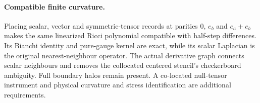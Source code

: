 \paragraph{Compatible finite curvature.}
Placing scalar, vector and symmetric-tensor records at parities
$0$, $e_b$ and $e_a+e_b$ makes the same linearized Ricci polynomial compatible
with half-step differences. Its Bianchi identity and pure-gauge kernel are
exact, while its scalar Laplacian is the original nearest-neighbour operator.
The actual derivative graph connects scalar neighbours and removes the
collocated centered stencil's checkerboard ambiguity. Full boundary halos
remain present. A co-located null-tensor instrument and physical curvature
and stress identification are additional requirements.
